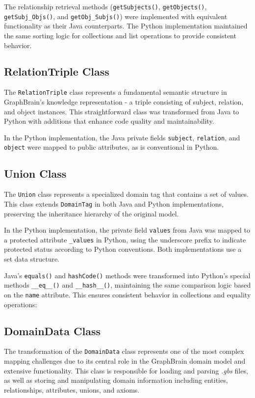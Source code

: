 \documentclass[12pt,a4paper]{article}
\begin{document}
The relationship retrieval methods (\texttt{getSubjects()}, \texttt{getObjects()}, \texttt{getSubj\_Objs()}, and \texttt{getObj\_Subjs()}) were implemented with equivalent functionality as their Java counterparts. The Python implementation maintained the same sorting logic for collections and list operations to provide consistent behavior.


\subsection{RelationTriple Class}
The \texttt{RelationTriple} class represents a fundamental semantic structure in GraphBrain's knowledge representation - a triple consisting of subject, relation, and object instances. This straightforward class was transformed from Java to Python with additions that enhance code quality and maintainability.

In the Python implementation, the Java private fields \texttt{subject}, \texttt{relation}, and \texttt{object} were mapped to public attributes, as is conventional in Python. 


\subsection{Union Class}
The \texttt{Union} class represents a specialized domain tag that contains a set of values. This class extends \texttt{DomainTag} in both Java and Python implementations, preserving the inheritance hierarchy of the original model.

In the Python implementation, the private field \texttt{values} from Java was mapped to a protected attribute \texttt{\_values} in Python, using the underscore prefix to indicate protected status according to Python conventions. Both implementations use a set data structure.

Java's \texttt{equals()} and \texttt{hashCode()} methods were transformed into Python's special methods \texttt{\_\_eq\_\_()} and \texttt{\_\_hash\_\_()}, maintaining the same comparison logic based on the \texttt{name} attribute. This ensures consistent behavior in collections and equality operations:



\subsection{DomainData Class}
The transformation of the \texttt{DomainData} class represents one of the most complex mapping challenges due to its central role in the GraphBrain domain model and extensive functionality. This class is responsible for loading and parsing \textit{.gbs} files, as well as storing and manipulating domain information including entities, relationships, attributes, unions, and axioms.
\end{document}
